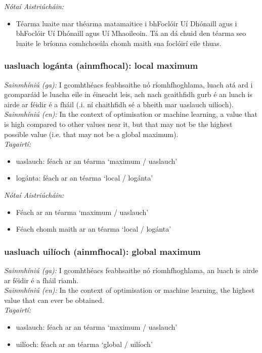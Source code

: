  \noindent \textit{Nótaí Aistriúcháin:}
\begin{itemize}
	\item Téarma luaite mar théarma matamaitice i bhFoclóir Uí Dhónaill agus i bhFoclóir Uí Dhónaill agus Uí Mhaoileoin. Tá an dá chuid den téarma seo luaite le bríonna comhchosúla chomh maith sna foclóirí eile thuas.
\end{itemize}


\subsubsection*{uasluach logánta (ainmfhocal): local maximum}
 \noindent \textit{Sainmhíniú (ga):} I gcomhthéacs feabhsaithe nó ríomhfhoghlama, luach atá ard i gcomparáid le luacha eile in éineacht leis, ach nach gcaithfidh gurb é an luach is airde ar féidir é a fháil (.i. ní chaithfidh sé a bheith mar uaslauch uilíoch).
\\
 \noindent \textit{Sainmhíniú (en):} In the context of optimisation or machine learning, a value that is high compared to other values near it, but that may not be the highest possible value (i.e. that may not be a global maximum).
\\
 \noindent \textit{Tagairtí:}
\begin{itemize}
	\item uaslauch: féach ar an téarma `maximum / uaslauch'
	\item logánta: féach ar an téarma `local / logánta'
\end{itemize}

 \noindent \textit{Nótaí Aistriúcháin:}
\begin{itemize}
	\item Féach ar an téarma `maximum / uaslauch'
	\item Féach chomh maith ar an téarma `local / logánta'
\end{itemize}


\subsubsection*{uasluach uilíoch (ainmfhocal): global maximum}
 \noindent \textit{Sainmhíniú (ga):} I gcomhthéacs feabhsaithe nó ríomhfhoghlama, an luach is airde ar féidir é a fháil riamh.
\\
 \noindent \textit{Sainmhíniú (en):} In the context of optimisation or machine learning, the highest value that can ever be obtained.
\\
 \noindent \textit{Tagairtí:}
\begin{itemize}
	\item uaslauch: féach ar an téarma `maximum / uaslauch'
	\item uilíoch: féach ar an téarma `global / uilíoch'
\end{itemize}

